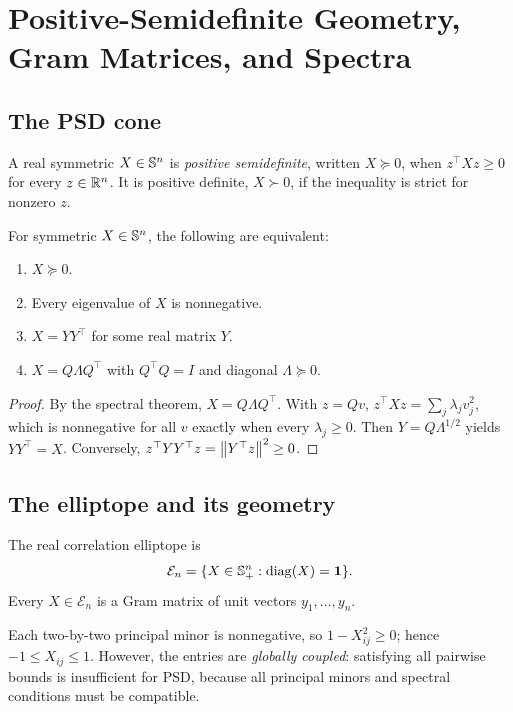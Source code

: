 \chapter{Positive-Semidefinite Geometry, Gram Matrices, and Spectra}\label{ch:psd}
\section{The PSD cone}
\begin{definition}
A real symmetric $X\in\mathbb{S}^n$ is \emph{positive semidefinite}, written $X\succeq0$, when $z^\top Xz\ge0$ for every $z\in\mathbb{R}^n$. It is positive definite, $X\succ0$, if the inequality is strict for nonzero $z$.
\end{definition}
\begin{theorem}\label{thm:psd-equiv}
For symmetric $X\in\mathbb{S}^n$, the following are equivalent:
\begin{enumerate}
\item $X\succeq0$.
\item Every eigenvalue of $X$ is nonnegative.
\item $X=YY^\top$ for some real matrix $Y$.
\item $X=Q\Lambda Q^\top$ with $Q^\top Q=I$ and diagonal $\Lambda\succeq0$.
\end{enumerate}
\end{theorem}
\begin{proof}
By the spectral theorem, $X=Q\Lambda Q^\top$. With $z=Qv$, $z^\top Xz=\sum_j\lambda_jv_j^2$, which is nonnegative for all $v$ exactly when every $\lambda_j\ge0$. Then $Y=Q\Lambda^{1/2}$ yields $YY^\top=X$. Conversely, $z^\top YY^\top z=\left\lVert Y^\top z\right\rVert^2\ge0$.
\end{proof}

\section{The elliptope and its geometry}
\begin{definition}[Elliptope]
The real correlation elliptope is
\[
\mathcal E_n=\{X\in\mathbb{S}_+^n:\operatorname{diag}(X)=\boldsymbol{1}\}.
\]
Every $X\in\mathcal E_n$ is a Gram matrix of unit vectors $y_1,\ldots,y_n$.
\end{definition}
Each two-by-two principal minor is nonnegative, so $1-X_{ij}^2\ge0$; hence $-1\le X_{ij}\le1$. However, the entries are \emph{globally coupled}: satisfying all pairwise bounds is insufficient for PSD, because all principal minors and spectral conditions must be compatible.

